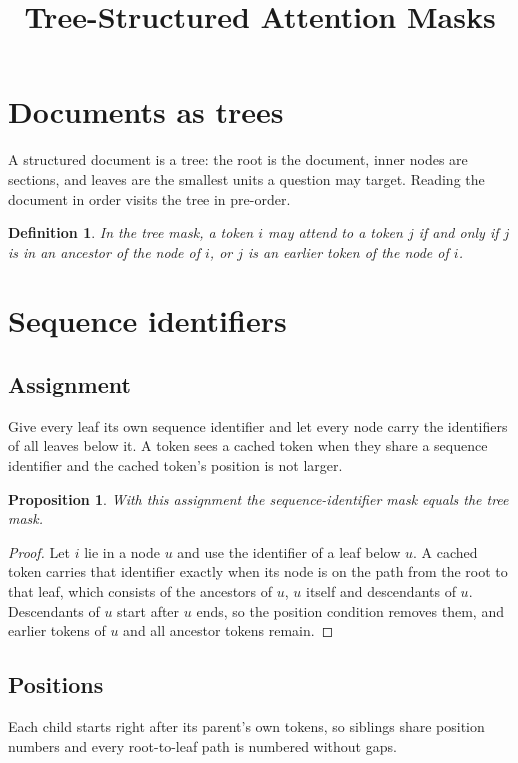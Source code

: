 \documentclass{article}
\title{Tree-Structured Attention Masks}
\newtheorem{defn}{Definition}
\newtheorem{prop}{Proposition}
\begin{document}
\maketitle

\section{Documents as trees}
A structured document is a tree: the root is the document, inner nodes are sections, and leaves are the smallest units a question may target.
Reading the document in order visits the tree in pre-order.

\begin{defn}
In the \emph{tree mask}, a token $i$ may attend to a token $j$ if and only if $j$ is in an ancestor of the node of $i$, or $j$ is an earlier token of the node of $i$.
\end{defn}

\section{Sequence identifiers}
\subsection{Assignment}
Give every leaf its own sequence identifier and let every node carry the identifiers of all leaves below it.
A token sees a cached token when they share a sequence identifier and the cached token's position is not larger.

\begin{prop}\label{prop:equiv}
With this assignment the sequence-identifier mask equals the tree mask.
\end{prop}
\begin{proof}
Let $i$ lie in a node $u$ and use the identifier of a leaf below $u$.
A cached token carries that identifier exactly when its node is on the path from the root to that leaf, which consists of the ancestors of $u$, $u$ itself and descendants of $u$.
Descendants of $u$ start after $u$ ends, so the position condition removes them, and earlier tokens of $u$ and all ancestor tokens remain.
\end{proof}

\subsection{Positions}
Each child starts right after its parent's own tokens, so siblings share position numbers and every root-to-leaf path is numbered without gaps.
\end{document}
